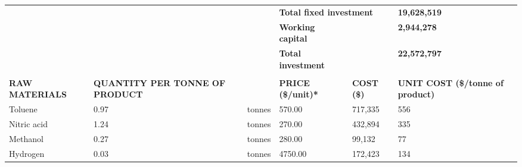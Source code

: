 \begin{table}[H]
\begin{tabular}{llllll}
                                              &                                        &                                                                    & \multicolumn{2}{l}{\textbf{Total fixed investment}} & \textbf{19,628,519}                      \\
                                              &                                        &                                                                    & \textbf{Working capital}    &                       & \textbf{2,944,278}                       \\ \cline{6-6} 
                                              &                                        &                                                                    & \textbf{Total investment}   &                       & \textbf{22,572,797}                      \\
                                              &                                        &                                                                    &                             &                       &                                          \\
\textbf{RAW MATERIALS}                        & \textbf{QUANTITY PER TONNE OF PRODUCT} & \textbf{}                                                          & \textbf{PRICE (\$/unit)*}   & \textbf{COST (\$)}    & \textbf{UNIT COST (\$/tonne of product)} \\ \hline
Toluene                                       & 0.97                                   & tonnes                                                             & 570.00                      & 717,335               & 556                                      \\
Nitric acid                                   & 1.24                                   & tonnes                                                             & 270.00                      & 432,894               & 335                                      \\
Methanol                                      & 0.27                                   & tonnes                                                             & 280.00                      & 99,132                & 77                                       \\
Hydrogen                                      & 0.03                                   & tonnes                                                             & 4750.00                     & 172,423               & 134                                      \\

\end{tabular}
\end{table}
